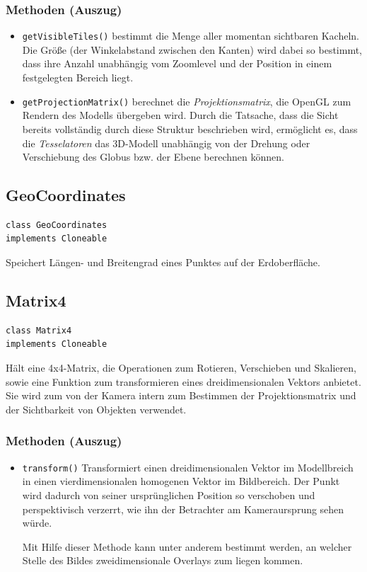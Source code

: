 \documentclass[10pt]{scrreprt}
\begin{document}
\subsubsection*{Methoden (Auszug)}
\begin{itemize}
\item \texttt{getVisibleTiles()} bestimmt die Menge aller momentan sichtbaren Kacheln. Die Größe (der Winkelabstand zwischen den Kanten) wird dabei so bestimmt, dass ihre Anzahl unabhängig vom Zoomlevel und der Position in einem festgelegten Bereich liegt.
\item \texttt{getProjectionMatrix()} berechnet die \textit{Projektionsmatrix}, die OpenGL zum Rendern des Modells übergeben wird. Durch die Tatsache, dass die Sicht bereits vollständig durch diese Struktur beschrieben wird, ermöglicht es, dass die \textit{Tesselatoren} das 3D-Modell unabhängig von der Drehung oder Verschiebung des Globus bzw. der Ebene berechnen können.
\end{itemize}

\vspace{2mm}
\subsection*{GeoCoordinates}
\begin{lstlisting}
class GeoCoordinates
implements Cloneable
\end{lstlisting}
Speichert Längen- und Breitengrad eines Punktes auf der Erdoberfläche.

\pagebreak

\subsection*{Matrix4}
\begin{lstlisting}
class Matrix4
implements Cloneable
\end{lstlisting}
Hält eine 4x4-Matrix, die Operationen zum Rotieren, Verschieben und Skalieren, sowie eine Funktion zum transformieren eines dreidimensionalen Vektors anbietet. Sie wird zum von der Kamera intern zum Bestimmen der Projektionsmatrix und der Sichtbarkeit von Objekten verwendet.\\
\subsubsection*{Methoden (Auszug)}
\begin{itemize}
\item \texttt{transform()} Transformiert einen dreidimensionalen Vektor im Modellbreich in einen vierdimensionalen homogenen Vektor im Bildbereich. Der Punkt wird dadurch von seiner ursprünglichen Position so verschoben und perspektivisch verzerrt, wie ihn der Betrachter am Kameraursprung sehen würde.

Mit Hilfe dieser Methode kann unter anderem bestimmt werden, an welcher Stelle des Bildes zweidimensionale Overlays zum liegen kommen.
\end{itemize}
\end{document}
